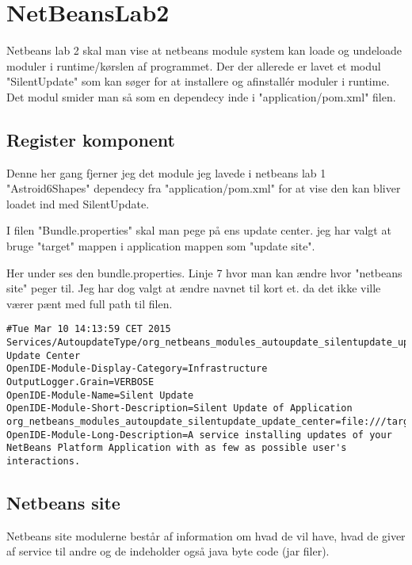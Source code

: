 \newpage
\section{NetBeansLab2}
Netbeans lab 2 skal man vise at netbeans module system kan loade og undeloade
moduler i runtime/kørslen af programmet. Der der allerede er lavet et modul
"SilentUpdate" som kan søger for at installere og afinstallér moduler i
runtime. Det modul smider man så som en dependecy inde i "application/pom.xml"
filen.

\subsection{Register komponent}
Denne her gang fjerner jeg det module jeg lavede i netbeans lab 1
"Astroid6Shapes" dependecy fra "application/pom.xml" for at vise den kan bliver
loadet ind med SilentUpdate.



I filen "Bundle.properties" skal man pege på ens update center. jeg har valgt at 
bruge "target" mappen i application mappen som "update site". 

Her under ses den bundle.properties. Linje 7 hvor man kan ændre hvor "netbeans
site" peger til.  Jeg har dog valgt at ændre navnet til kort et. da det ikke
ville værer pænt med full path til filen.

\begin{lstlisting}[caption={Bundle.properties}, label={lst:App}]
#Tue Mar 10 14:13:59 CET 2015
Services/AutoupdateType/org_netbeans_modules_autoupdate_silentupdate_update_center.instance=Sample Update Center
OpenIDE-Module-Display-Category=Infrastructure
OutputLogger.Grain=VERBOSE
OpenIDE-Module-Name=Silent Update
OpenIDE-Module-Short-Description=Silent Update of Application
org_netbeans_modules_autoupdate_silentupdate_update_center=file:///target/netbeans_site/updates.xml
OpenIDE-Module-Long-Description=A service installing updates of your NetBeans Platform Application with as few as possible user's interactions.
\end{lstlisting}

\subsection{Netbeans site}
Netbeans site modulerne består af information om hvad de vil have, hvad de giver
af service til andre og de indeholder også java byte code (jar filer).

